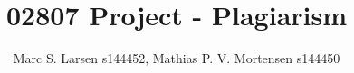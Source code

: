 

\setcounter{secnumdepth}{0}

\title{02807 Project - Plagiarism} 
\author{Marc S. Larsen s144452, Mathias P. V. Mortensen s144450}
\date{\vspace{-5ex}}



\maketitle







